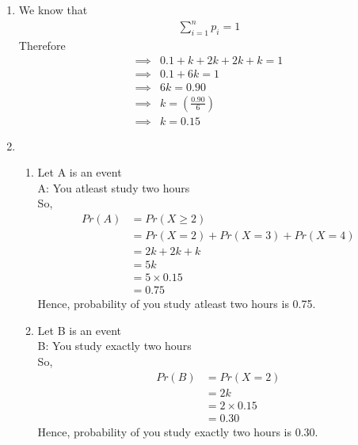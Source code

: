 \documentclass[journal,12pt,twocolumn]{IEEEtran}
\renewcommand\thesection{\arabic{section}}
\begin{document}
    \begin{enumerate}[label=\arabic*.,ref=\thesection.\theenumi]
        \item 
        We know that
        \begin{align}
                \sum_{i = 1}^{n} p_i  = 1
            \end{align}
            Therefore
            \begin{align}
                \implies &0.1 + k + 2k + 2k + k = 1 \\
                \implies &0.1 + 6k = 1 \\
                \implies &6k = 0.90 \\
                \implies &k = \left(\frac{0.90}{6}\right) \\
                \implies &k = 0.15
            \end{align}
        \item 
         \begin{enumerate}
            \item 
             Let A is an event \\
             A: You atleast study two hours \\
             So, 
             \begin{align}
                Pr(A)  &= Pr(X\geq 2) \\
                &= Pr(X=2) + Pr(X=3) + Pr(X=4) \\
                &= 2k + 2k + k \\
                &= 5k \\
                &= 5\times 0.15 \\
                &= 0.75
            \end{align}
            Hence, probability of you study atleast two hours is 0.75. \\
            \item 
             Let B is an event \\
             B: You study exactly two hours \\
             So, 
             \begin{align}
                Pr(B)  &= Pr(X=2) \\
                       &= 2k \\
                       &= 2\times 0.15 \\
                       &= 0.30
            \end{align}
            Hence, probability of you study exactly two hours is 0.30. \\

\end{enumerate}
\end{enumerate}
\end{document}
